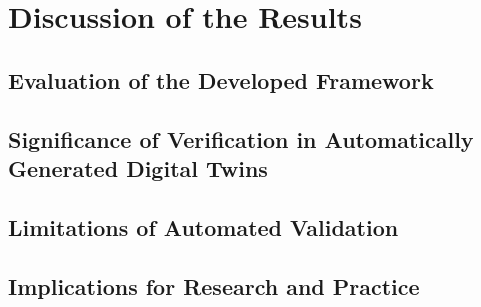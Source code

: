 \chapter{Discussion of the Results}
\label{chap:discussion}

\section{Evaluation of the Developed Framework}

\section{Significance of Verification in Automatically Generated Digital Twins}

\section{Limitations of Automated Validation}

\section{Implications for Research and Practice}
